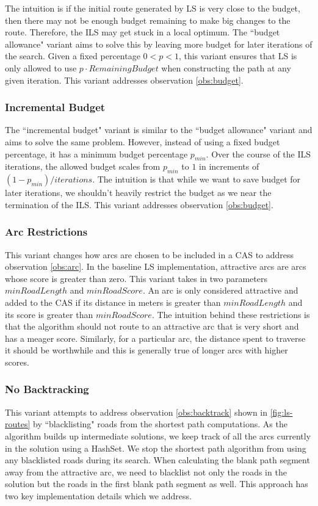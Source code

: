 \documentclass[honors]{union-cs-thesis}
\begin{document}
The intuition is if the initial route generated by LS is very close to the budget, then there may not be enough budget remaining to make big changes to the route. Therefore, the ILS may get stuck in a local optimum. The ``budget allowance" variant aims to solve this by leaving more budget for later iterations of the search. Given a fixed percentage $0 < p < 1$, this variant ensures that LS is only allowed to use $p \cdot RemainingBudget$ when constructing the path at any given iteration. This variant addresses observation \ref{obs:budget}.

\subsubsection{Incremental Budget}
The ``incremental budget" variant is similar to the ``budget allowance" variant and aims to solve the same problem. However, instead of using a fixed budget percentage, it has a minimum budget percentage $p_{min}$. Over the course of the ILS iterations, the allowed budget scales from $p_{min}$ to $1$ in increments of $(1 - p_{min}) / iterations$. The intuition is that while we want to save budget for later iterations, we shouldn't heavily restrict the budget as we near the termination of the ILS. This variant addresses observation \ref{obs:budget}.


\subsubsection{Arc Restrictions}
This variant changes how arcs are chosen to be included in a CAS to address observation \ref{obs:arc}. In the baseline LS implementation, attractive arcs are arcs whose score is greater than zero. This variant takes in two parameters $minRoadLength$ and $minRoadScore$. An arc is only considered attractive and added to the CAS if its distance in meters is greater than $minRoadLength$ and its score is greater than $minRoadScore$. The intuition behind these restrictions is that the algorithm should not route to an attractive arc that is very short and has a meager score. Similarly, for a particular arc, the distance spent to traverse it should be worthwhile and this is generally true of longer arcs with higher scores.


\subsubsection{No Backtracking}
This variant attempts to address observation \ref{obs:backtrack} shown in \cref{fig:ls-routes} by ``blacklisting" roads from the shortest path computations. As the algorithm builds up intermediate solutions, we keep track of all the arcs currently in the solution using a HashSet. We stop the shortest path algorithm from using any blacklisted roads during its search. When calculating the blank path segment away from the attractive arc, we need to blacklist not only the roads in the solution but the roads in the first blank path segment as well. This approach has two key implementation details which we address.
\end{document}

